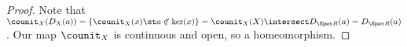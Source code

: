 \begin{proof}
Note that 
$\counit_X(D_X(a))= \{\counit_X(x) \st a\not\in \ker(x)\} = \counit_X(X) \intersect D_{\Spec R}(a) = D_{\Spec R}(a)$.
Our map $\counit_X$ is continuous and open, so a homeomorphism.
\end{proof}